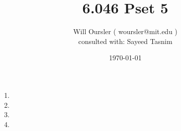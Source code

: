 \documentclass{article}
\title{ 6.046 Pset 5 }
\date{ \today }
\author{Will Oursler ( woursler@mit.edu ) \\ consulted with: Sayeed Tasnim }
\begin{document}
\maketitle

\begin{enumerate}

\item 
\item 
\item 
\item 

\end{enumerate}
\end{document}
